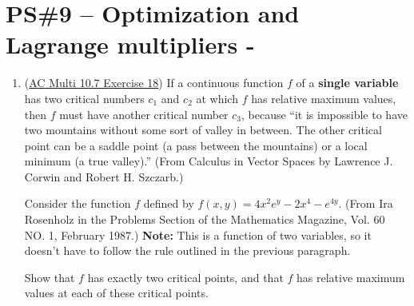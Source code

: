 


%


\allowdisplaybreaks
\section{PS\#9 -- Optimization and Lagrange multipliers -  }

\begin{enumerate}[leftmargin=0pt]

    \item (\href{https://activecalculus.org/multi/S-10-7-Optimization.html#S-10-7-Optimization-8-18}{AC Multi 10.7 Exercise 18}) If a continuous function $f$ of a \textbf{single variable} has two critical numbers $c_1$ and $c_2$ at which $f$ has relative maximum values, then $f$ must have another critical number $c_3$, because ``it is impossible to have two mountains without some sort of valley in between. The other critical point can be a saddle point (a pass between the mountains) or a local minimum (a true valley).'' (From Calculus in Vector Spaces by Lawrence J. Corwin and Robert H. Szczarb.)
    
    Consider the function $f$ defined by $f(x,y) = 4x^2e^y -2x^4 -e^{4y}.$ (From Ira Rosenholz in the Problems Section of the Mathematics Magazine, Vol. 60 NO. 1, February 1987.) \textbf{Note:} This is a function of two variables, so it doesn't have to follow the rule outlined in the previous paragraph.
    
    Show that $f$ has exactly two critical points, and that $f$ has relative maximum values at each of these critical points. 
    

\end{enumerate}
